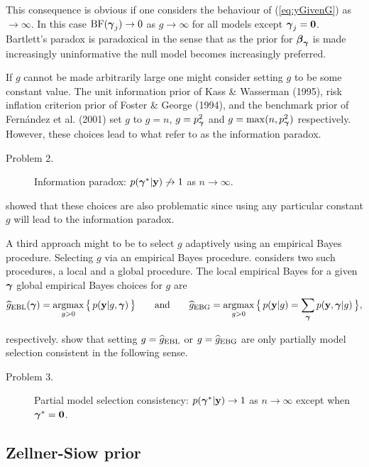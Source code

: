 \noindent This consequence is obvious if one considers the behaviour of 
(\ref{eq:yGivenG}) as $\to\infty$. In this case $\mbox{BF}({\boldsymbol \gamma}_j)\to 0$  as $g\to\infty$ 
for all models except ${\boldsymbol \gamma}_j = {\bf 0}$.
Bartlett's paradox is paradoxical in the sense that as the prior for ${\boldsymbol \beta}_{\boldsymbol \gamma}$
is made increasingly uninformative the null model becomes increasingly preferred.

If $g$ cannot be made arbitrarily large one might consider setting $g$ to be some constant
value. The unit information prior of Kass \& Wasserman (1995), risk inflation criterion prior of 
Foster \& George (1994), and the benchmark prior of Fern\'andez et al. (2001) set $g$ to $g=n$, 
$g=p_{\boldsymbol \gamma}^2$ and $g = \max(n,p_{\boldsymbol \gamma}^2)$ respectively. 
However, these choices lead to what \cite{Liang2008} refer to as
the information paradox. 
\begin{description}
	\item[Problem 2.] Information paradox: $p({\boldsymbol \gamma}^*|{\bf y}) \not\to 1$ as $n\to\infty$.
\end{description}

\noindent  
\cite{Liang2008} showed that these choices
are also problematic since using any particular constant $g$ will lead to the information paradox.

A third approach might to be to select $g$ adaptively using an empirical Bayes procedure.
Selecting $g$ via an empirical Bayes procedure. 
\cite{Liang2008} considers two such procedures, a local and a global procedure.
The local empirical Bayes for a given ${\boldsymbol \gamma}$ global empirical Bayes choices
for $g$ are
$$
\ds \widehat{g}_{\mbox{\scriptsize EBL}}(\vgamma) = \argmax_{g>0} \big\{ \, p(\vy|g,\vgamma) \, \big\}
\qquad \mbox{and} \qquad 
\ds \widehat{g}_{\mbox{\scriptsize EBG}} = \argmax_{g>0} \big\{ \, p(\vy|g) = \sum_{\vgamma}  p(\vy,\vgamma|g)  \, \big\},
$$ 

\noindent respectively. \cite{Liang2008} show that setting
$g = \widehat{g}_{\mbox{\scriptsize EBL}}$ or 
$g = \widehat{g}_{\mbox{\scriptsize EBG}}$
are only partially model selection consistent in the following sense.
\begin{description}
	\item[Problem 3.] Partial model selection consistency: $p({\boldsymbol \gamma}^*|{\bf y}) \to 1$ as $n\to\infty$ except
	when ${\boldsymbol \gamma}^* = {\bf 0}$.
\end{description}

\newpage 


\subsection{Zellner-Siow prior}


